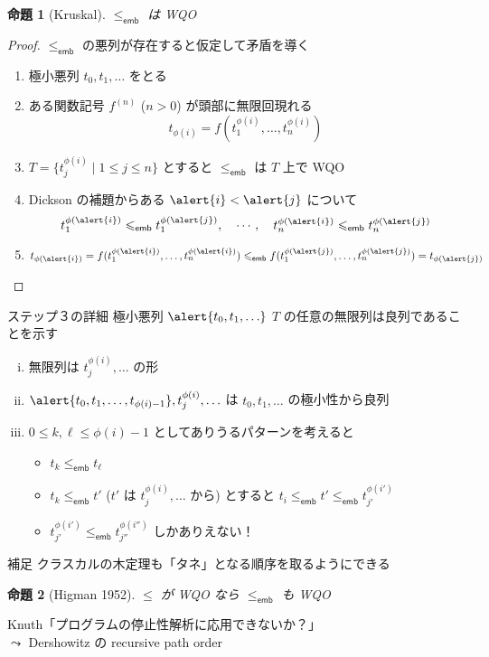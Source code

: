 \documentclass{beamer}
\newtheorem{prop}{命題}
\newcommand{\emb}{\mathsf{emb}}
\begin{document}
\begin{frame}
\begin{prop}[Kruskal]
$\leqslant_\emb$ は WQO
\end{prop}
\begin{proof}
$\leqslant_\emb$ の悪列が存在すると仮定して矛盾を導く
\begin{enumerate}
\itemsep 0.5em
\item 極小悪列 $t_0, t_1, \ldots$ をとる
\item ある関数記号 $f^{(n)}$ ($n > 0$) が頭部に無限回現れる
\[
t_{\phi(i)} = f(t_{1}^{\phi(i)}, \ldots, t_{n}^{\phi(i)})
\]
\item $T = \{ t_{j}^{\phi(i)} \mid 1 \leqslant j \leqslant n \}$ とすると
$\leqslant_\emb$ は $T$ 上で WQO 

\item Dickson の補題からある $\alert{i} < \alert{j}$ について
\[
t_{1}^{\phi(\alert{i})} \leqslant_\emb t_{1}^{\phi(\alert{j})},
\quad
\cdots,
\quad
t_{n}^{\phi(\alert{i})} \leqslant_\emb t_{n}^{\phi(\alert{j})}
\]

\item $t_{\phi(\alert{i})} = f(t_{1}^{\phi(\alert{i})}, \ldots, t_{n}^{\phi(\alert{i})}) \leqslant_\emb f(t_{1}^{\phi(\alert{j})}, \ldots, t_{n}^{\phi(\alert{j})}) = t_{\phi(\alert{j})}$ \lightning
\end{enumerate}
\end{proof}
\end{frame}

\begin{frame}{ステップ３の詳細}
極小悪列 $\alert{t_0, t_1, \ldots}$
\vfill
$T$ の任意の無限列は良列であることを示す
\begin{enumerate}[(i)]
\itemsep 0.5em
    \item 無限列は $t_{j}^{\phi(i)}, \ldots$ の形
    \item $\alert{t_0, t_1, \ldots, t_{\phi(i)-1}}, t_{j}^{\phi(i)}, \ldots$ は $t_0, t_1, \ldots$ の極小性から良列
    \item $0 \leqslant k, \ell \leqslant \phi(i)-1$ としてありうるパターンを考えると
    \begin{itemize}
        \item $t_k \leqslant_\emb t_\ell$ \lightning
        \item $t_k \leqslant_\emb t'$ ($t'$ は $t_{j}^{\phi(i)}, \ldots$ から) とすると $t_i \leqslant_\emb t' \leqslant_\emb t_{j'}^{\phi(i')}$ \lightning
        \item $t_{j'}^{\phi(i')} \leqslant_\emb t_{j''}^{\phi(i'')}$ しかありえない！
    \end{itemize}
\end{enumerate}
\end{frame}

\begin{frame}{補足}
クラスカルの木定理も「タネ」となる順序を取るようにできる
\begin{prop}[Higman 1952]
$\leqslant$ が WQO なら $\leqslant_\emb$ も WQO
\end{prop}
\vfill
Knuth「プログラムの停止性解析に応用できないか？」\\
\pause
$\leadsto$ Dershowitz の recursive path order
\end{frame}
\end{document}
